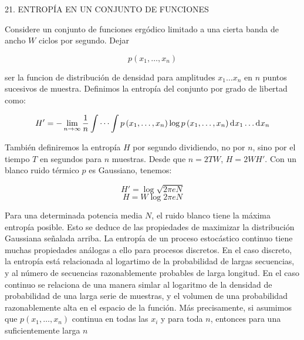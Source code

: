21. ENTROP\'IA EN UN CONJUNTO DE FUNCIONES\newline

Considere un conjunto de funciones erg\'odico limitado a una cierta banda de ancho  $W$ ciclos por segundo. Dejar

\begin{equation}
p\left ( x_{1}, \ldots ,x_{n}\right )
\end{equation}

ser la funcion de distribuci\'on de densidad para amplitudes $x_{1}\dots x_{n}$ en $n$ puntos sucesivos de muestra. Definimos la entrop\'ia del conjunto por grado de libertad como:

\begin{equation}
{H}'=-\lim_{n\rightarrow \infty }\frac{1}{n}\int \cdots \int p\left ( x_{1}, \ldots ,x_{n}\right ) \log p\left ( x_{1}, \ldots ,x_{n}\right ) \diff x _{1} \ldots  \diff x _{n}
\end{equation}

Tambi\'en definiremos la entrop\'ia $H$ por segundo dividiendo, no por $n$, sino por el tiempo $T$ en segundos para $n$ muestras. Desde que $n=2TW$, $H=2W{H}'$.\newline
Con un blanco ruido t\'ermico $p$ es Gaussiano, tenemos:

\begin{equation}
{H}'=\log \sqrt{2\pi eN}
\end{equation}
\begin{equation}
H=W\log 2\pi eN
\end{equation}

Para una determinada potencia media $N$, el ruido blanco tiene la m\'axima entrop\'ia posible. Esto se deduce de las propiedades de maximizar la distribuci\'on Gaussiana se\~nalada arriba.\newline
La entrop\'ia de un proceso estoc\'astico continuo tiene muchas propiedades an\'alogas a ello para procesos discretos. En el caso discreto, la entrop\'ia est\'a relacionada al logartimo de la probabilidad de largas secuencias, y al n\'umero de secuencias razonablemente probables de larga longitud. En el caso continuo se relaciona de una manera simlar al logaritmo de la densidad de probabilidad de una larga serie de muestras, y el volumen de una probabilidad razonablemente alta en el espacio de la funci\'on.\newline
M\'as precisamente, si asumimos que $p\left ( x_{1},\dots ,x_{n} \right )$ continua en todas las $x_{i}$ y para toda $n$, entonces para una suficientemente larga $n$

